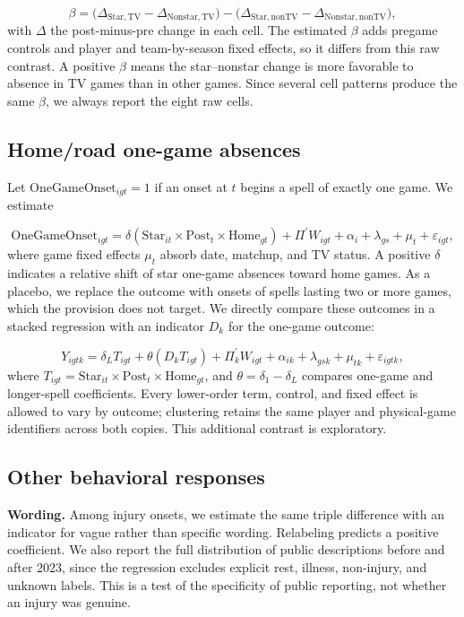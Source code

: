 \documentclass[11pt]{article}
\begin{document}
\[\beta=\bigl(\Delta_{\mathrm{Star,TV}}-\Delta_{\mathrm{Nonstar,TV}}\bigr)-\bigl(\Delta_{\mathrm{Star,nonTV}}-\Delta_{\mathrm{Nonstar,nonTV}}\bigr),\]
with $\Delta$ the post-minus-pre change in each cell. The estimated $\beta$ adds pregame controls and player and team-by-season fixed effects, so it differs from this raw contrast. A positive $\beta$ means the star--nonstar change is more favorable to absence in TV games than in other games. Since several cell patterns produce the same $\beta$, we always report the eight raw cells.

\subsection{Home/road one-game absences}

Let $\mathrm{OneGameOnset}_{igt}=1$ if an onset at $t$ begins a spell of exactly one game. We estimate

\[\mathrm{OneGameOnset}_{igt}=\delta(\mathrm{Star}_{it}\times\mathrm{Post}_{t}\times\mathrm{Home}_{gt})+\Pi^{\prime}W_{igt}+\alpha_i+\lambda_{gs}+\mu_t+\varepsilon_{igt},\]
where game fixed effects $\mu_t$ absorb date, matchup, and TV status. A positive $\delta$ indicates a relative shift of star one-game absences toward home games. As a placebo, we replace the outcome with onsets of spells lasting two or more games, which the provision does not target. We directly compare these outcomes in a stacked regression with an indicator $D_k$ for the one-game outcome:

\[Y_{igtk}=\delta_L T_{igt}+\theta(D_k T_{igt})+\Pi_k^{\prime}W_{igt}+\alpha_{ik}+\lambda_{gsk}+\mu_{tk}+\varepsilon_{igtk},\]
where $T_{igt}=\mathrm{Star}_{it}\times\mathrm{Post}_t\times\mathrm{Home}_{gt}$, and $\theta=\delta_1-\delta_L$ compares one-game and longer-spell coefficients. Every lower-order term, control, and fixed effect is allowed to vary by outcome; clustering retains the same player and physical-game identifiers across both copies. This additional contrast is exploratory.

\subsection{Other behavioral responses}
\noindent\textbf{Wording.} Among injury onsets, we estimate the same triple difference with an indicator for vague rather than specific wording. Relabeling predicts a positive coefficient. We also report the full distribution of public descriptions before and after 2023, since the regression excludes explicit rest, illness, non-injury, and unknown labels. This is a test of the specificity of public reporting, not whether an injury was genuine.
\end{document}

